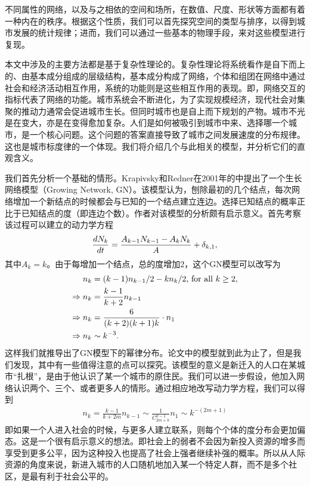 不同属性的网络，以及与之相依的空间和场所，在数值、尺度、形状等方面都有着一种内在的秩序。根据这个性质，我们可以首先探究空间的类型与排序，以得到城市发展的统计规律；进而，我们可以通过一些基本的物理手段，来对这些模型进行复现。

本文中涉及的主要方法都是基于复杂性理论的。复杂性理论将系统看作是自下而上的、由基本成分组成的层级结构，基本成分构成了网络，个体和组团在网络中通过社会和经济活动相互作用，系统的功能则是这些相互作用的表现。即，网络交互的指标代表了网络的功能。城市系统会不断进化，为了实现规模经济，现代社会对集聚的推动力通常会促进城市生长。但同时城市也是自上而下规划的产物。城市不光是在变大，亦是在变得愈加复杂。人们是如何被吸引到城市中来、选择哪一个城市，是一个核心问题。这个问题的答案直接导致了城市之间发展速度的分布规律。这也是城市标度律的一个体现。我们将介绍几个与此相关的模型，并分析它们的直观含义。

我们首先分析一个基础的情形。Krapivsky和Redner在2001年的\cite{PhysRevE.63.066123}中提出了一个生长网络模型（Growing Network, GN）。该模型认为，刨除最初的几个结点，每次网络增加一个新结点的时候都会与已知的一个结点建立连边。选择已知结点的概率正比于已知结点的度（即连边个数）。作者对该模型的分析颇有启示意义。首先考察该过程可以建立的动力学方程
\begin{align} 
    \frac{dN_k}{dt} = \frac{A_{k-1}N_{k-1} - A_k N_k}{A} + \delta_{k,1},\notag
\end{align}其中$A_k=k$。由于每增加一个结点，总的度增加2，这个GN模型可以改写为\begin{align}n_k &= (k-1)n_{k-1}/2 - kn_{k}/2 \text{, for all }k \geq 2, \notag\\
    \Rightarrow n_k &= \frac{k-1}{k+2}n_{k-1}\notag\\ 
    \Rightarrow n_k &= \frac{6}{(k+2)(k+1)k}\cdot n_1\notag\\ 
    \Rightarrow n_k &\sim k^{-3}.
\end{align}这样我们就推导出了GN模型下的幂律分布。论文中的模型就到此为止了，但是我们发现，其中有一些值得注意的点可以探究。该模型的意义是新迁入的人口在某城市“扎根”，是由于他认识了某一个城市的原住民。我们可以进一步假设，他加入网络认识两个、三个、或者更多人的情形。通过相应地改写动力学方程，我们可以得到\begin{align}
    n_k = \frac{k-1}{k+2m}n_{k-1}\sim\frac{1}{C_{2m+k}^{k-1}}n_1\sim k^{-(2m+1)} \label{degm}
\end{align}即如果一个人进入社会的时候，与更多人建立联系，则每个个体的度分布会更加偏态。这是一个很有启示意义的想法。即社会上的弱者不会因为新投入资源的增多而享受到更多公平，因为这种投入也提高了社会上强者继续补强的概率。所以从人际资源的角度来说，新进入城市的人口随机地加入某一个特定人群，而不是多个社区，是最有利于社会公平的。

